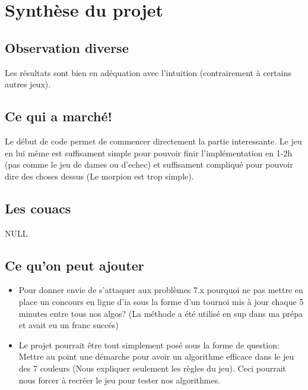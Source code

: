 \documentclass{article}
\begin{document}
    \section*{Synthèse du projet}

    \subsection*{Observation diverse}

    Les résultats sont bien en adéquation avec l'intuition (contrairement à certains autres jeux).

    \subsection*{Ce qui a marché!}

    Le début de code permet de commencer directement la partie interessante. Le jeu en lui même est suffisament simple pour pouvoir finir l'implémentation en 1-2h (pas comme le jeu de dames ou d'echec) et suffisament compliqué pour pouvoir dire des choses dessus (Le morpion est trop simple).

    \subsection*{Les couacs}

    NULL

    \subsection*{Ce qu'on peut ajouter}
    \begin{itemize}
    \item Pour donner envie de s'attaquer aux problèmes 7.x pourquoi ne pas mettre en place un concours en ligne d'ia sous la forme d'un tournoi mis à jour chaque 5 minutes entre tous nos algos? (La méthode a été utilisé en sup dans ma prépa et avait eu un franc succés)

    \item Le projet pourrait être tout simplement posé sous la forme de question: Mettre au point une démarche pour avoir un algorithme efficace dans le jeu des 7 couleurs (Nous expliquer seulement les règles du jeu). Ceci pourrait nous forcer à recréer le jeu pour tester nos algorithmes.


    \end{itemize}
\end{document}
